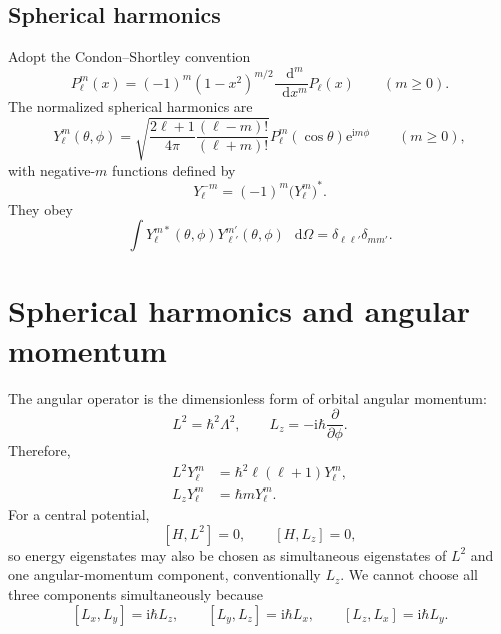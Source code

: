 \documentclass[11pt]{article}
\newcommand{\dd}{\mathop{}\!\mathrm{d}}
\newcommand{\ee}{\mathrm{e}}
\newcommand{\ii}{\mathrm{i}}
\newcommand{\comm}[2]{\left[#1,#2\right]}
\begin{document}
\subsection{Spherical harmonics}

Adopt the Condon--Shortley convention
\begin{equation}
  P_{\ell}^{m}(x)
  =(-1)^m(1-x^2)^{m/2}\frac{\dd^m}{\dd x^m}P_{\ell}(x)
  \qquad (m\geq0).
\end{equation}
The normalized spherical harmonics are
\begin{equation}
  \boxed{
  Y_{\ell}^{m}(\theta,\phi)
  =\sqrt{\frac{2\ell+1}{4\pi}
  \frac{(\ell-m)!}{(\ell+m)!}}
  P_{\ell}^{m}(\cos\theta)\ee^{\ii m\phi}
  }
  \qquad (m\geq0),
\end{equation}
with negative-$m$ functions defined by
\begin{equation}
  Y_{\ell}^{-m}=(-1)^m\bigl(Y_{\ell}^{m}\bigr)^*.
\end{equation}
They obey
\begin{equation}
  \int Y_{\ell}^{m*}(\theta,\phi)
  Y_{\ell'}^{m'}(\theta,\phi)\,\dd\Omega
  =\delta_{\ell\ell'}\delta_{mm'}.
\end{equation}

\section{Spherical harmonics and angular momentum}

The angular operator is the dimensionless form of orbital angular momentum:
\begin{equation}
  \boxed{L^2=\hbar^2\Lambda^2},
  \qquad
  \boxed{L_z=-\ii\hbar\frac{\partial}{\partial\phi}}.
\end{equation}
Therefore,
\begin{align}
  L^2Y_{\ell}^{m}
  &=\hbar^2\ell(\ell+1)Y_{\ell}^{m},\\
  L_zY_{\ell}^{m}
  &=\hbar mY_{\ell}^{m}.
\end{align}
For a central potential,
\begin{equation}
  \comm{H}{L^2}=0,
  \qquad
  \comm{H}{L_z}=0,
\end{equation}
so energy eigenstates may also be chosen as simultaneous eigenstates of $L^2$
and one angular-momentum component, conventionally $L_z$.  We cannot choose all
three components simultaneously because
\begin{equation}
  \comm{L_x}{L_y}=\ii\hbar L_z,
  \qquad
  \comm{L_y}{L_z}=\ii\hbar L_x,
  \qquad
  \comm{L_z}{L_x}=\ii\hbar L_y.
\end{equation}
\end{document}
